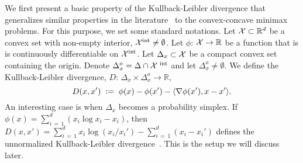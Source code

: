 \documentclass[12pt, final]{l4dc2023}
\begin{document}
We first present a basic property of the Kullback-Leibler divergence that generalizes similar properties in the literature~\citep{nemirovski2009robust,tseng2009accelerated,wei2020online} to the convex-concave minimax problems. For this purpose, we set some standard notations. Let ${\mathcal{X}}\subset \mathbb{R}^d$ be a convex set with non-empty interior, ${\mathcal{X}}^{\text{int}}\neq \emptyset$. Let $\phi$: ${\mathcal{X}}\to\mathbb{R}$ be a function that is is continuously differentiable on ${\mathcal{X}}^{\text{int}}$. Let $\Delta_x\subset {\mathcal{X}}$ be a compact convex set containing the origin. Denote $\Delta_x^o=\Delta\cap{\mathcal{X}}^{\text{ int}}$ and let $\Delta_x^o\neq \emptyset$. We define the Kullback-Leibler divergence, $D$: $\Delta_x\times\Delta_x^o\to\mathbb{R}$,
\[
D(x,x') \;\mathrel{\mathop:}=\; \phi(x) - \phi(x') - \langle \nabla\phi(x'), x-x'\rangle.
\]
An interesting case is when $\Delta_x$ becomes a probability simplex.
If $\phi(x)  = \sum_{i\,=\,1}^d (x_i\log x_i -x_i)$, then $D(x,x') =  \sum_{i\,=\,1}^d x_i\log (x_i /x_i') -\sum_{i\,=\,1}^d (x_i- x_i')$ defines the unnormalized Kullback-Leibler divergence~\citep{cover1999elements,boyd2004convex}. This is the setup we will discuss later.
\end{document}
